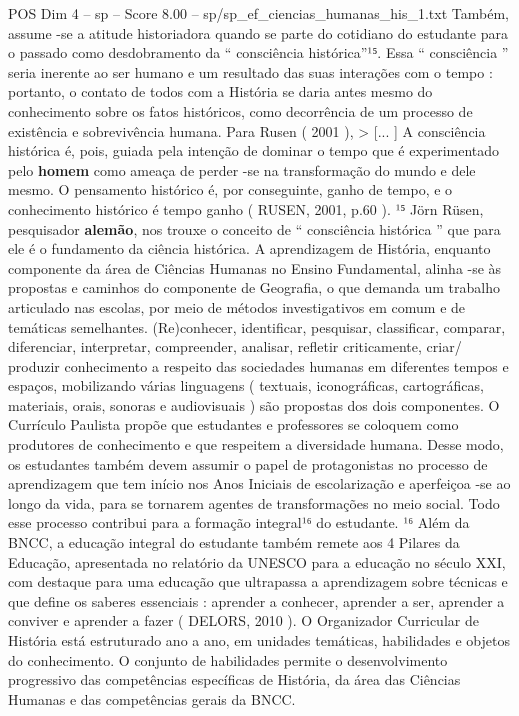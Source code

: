 \begin{textsample}{POS Dim 4 – sp – Score 8.00 – sp/sp\_ef\_ciencias\_humanas\_his\_1.txt}
Também, assume -se a atitude historiadora quando se parte do cotidiano do estudante para o passado como desdobramento da “ consciência histórica”¹⁵.
Essa “ consciência ” seria inerente ao ser humano e um resultado das suas interações com o tempo : portanto, o contato de todos com a História se daria antes mesmo do conhecimento sobre os fatos históricos, como decorrência de um processo de existência e sobrevivência humana.
Para Rusen ( 2001 ), > [... ] A consciência histórica é, pois, guiada pela intenção de dominar o tempo que é experimentado pelo \textbf{homem} como ameaça de perder -se na transformação do mundo e dele mesmo.
O pensamento histórico é, por conseguinte, ganho de tempo, e o conhecimento histórico é tempo ganho ( RUSEN, 2001, p.60 ). ¹⁵ Jörn Rüsen, pesquisador \textbf{alemão}, nos trouxe o conceito de “ consciência histórica ” que para ele é o fundamento da ciência histórica.
A aprendizagem de História, enquanto componente da área de Ciências Humanas no Ensino Fundamental, alinha -se às propostas e caminhos do componente de Geografia, o que demanda um trabalho articulado nas escolas, por meio de métodos investigativos em comum e de temáticas semelhantes. (Re)conhecer, identificar, pesquisar, classificar, comparar, diferenciar, interpretar, compreender, analisar, refletir criticamente, criar/ produzir conhecimento a respeito das sociedades humanas em diferentes tempos e espaços, mobilizando várias linguagens ( textuais, iconográficas, cartográficas, materiais, orais, sonoras e audiovisuais ) são propostas dos dois componentes.
O Currículo Paulista propõe que estudantes e professores se coloquem como produtores de conhecimento e que respeitem a diversidade humana.
Desse modo, os estudantes também devem assumir o papel de protagonistas no processo de aprendizagem que tem início nos Anos Iniciais de escolarização e aperfeiçoa -se ao longo da vida, para se tornarem agentes de transformações no meio social.
Todo esse processo contribui para a formação integral¹⁶ do estudante. ¹⁶ Além da BNCC, a educação integral do estudante também remete aos 4 Pilares da Educação, apresentada no relatório da UNESCO para a educação no século XXI, com destaque para uma educação que ultrapassa a aprendizagem sobre técnicas e que define os saberes essenciais : aprender a conhecer, aprender a ser, aprender a conviver e aprender a fazer ( DELORS, 2010 ).
O Organizador Curricular de História está estruturado ano a ano, em unidades temáticas, habilidades e objetos do conhecimento.
O conjunto de habilidades permite o desenvolvimento progressivo das competências específicas de História, da área das Ciências Humanas e das competências gerais da BNCC.

\end{textsample}

